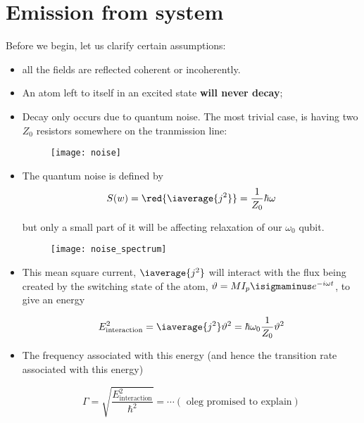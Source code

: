 
\section{Emission from system}
Before we begin, let us clarify certain assumptions:
\begin{itemize}
\item  \cite{Hoi_2015}  all  the  fields are  reflected  coherent  or
  incoherently.
\item An atom  left to itself in an excited  state \textbf{will never
    decay};
\item Decay only occurs due to  quantum noise. The most trivial case,
  is having two $ Z_0 $ resistors somewhere on the tranmission line:

\begin{figure}[h]
  \centering \texttt{[image: noise]}
\end{figure}

\noindent

\item  The  quantum  noise  \textbf{} is defined by
  \begin{equation}\label{key}
    S(w) = \red{\iaverage{j^2}} = \frac{1}{Z_0}\hbar\omega
  \end{equation}

  \noindent but only a small part  of it will be affecting relaxation
  of our $ \omega_0 $ qubit.

\begin{figure}[h]
  \centering \texttt{[image: noise\_spectrum]}
\end{figure}

\noindent

\item This mean square current, $ \iaverage{j^2} $ will interact with
  the  flux  being  created  by  the switching  state  of  the  atom,
  $ \vartheta = MI_p\isigmaminus e^{-i\omega t} $, to give an energy

  \begin{equation}\label{key}
    E_\text{interaction}^2 = \iaverage{j^2}\vartheta^2 = \hbar\omega_0\frac{1}{Z_0}\vartheta^2
  \end{equation}

\item  The  frequency associated  with  this  energy (and  hence  the
  transition rate associated with this energy)

  \begin{equation}\label{key}
    \Gamma = \sqrt{\frac{E_\text{interaction}^2}{\hbar^2}} = \cdots (\text{ oleg promised to explain})
  \end{equation}
\end{itemize}

